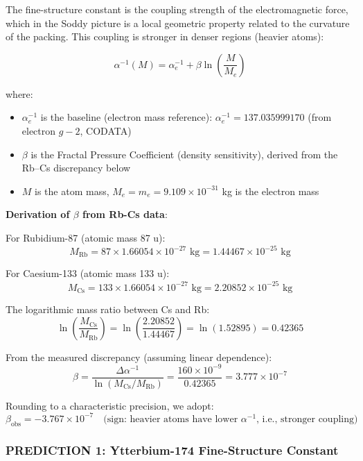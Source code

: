\documentclass[11pt,a4paper]{article}
\begin{document}
      The fine-structure constant is the coupling strength of the electromagnetic force, which in the Soddy picture is a local geometric property related to the curvature of the packing. This coupling is stronger in denser regions (heavier atoms):

      \[
      \alpha^{-1}(M) = \alpha^{-1}_e + \beta \ln\left(\frac{M}{M_e}\right)
      \]

      where:
      \begin{itemize}
        \item $\alpha^{-1}_e$ is the baseline (electron mass reference): $\alpha^{-1}_e = 137.035999170$ (from electron $g-2$, CODATA)
        \item $\beta$ is the Fractal Pressure Coefficient (density sensitivity), derived from the Rb--Cs discrepancy below
        \item $M$ is the atom mass, $M_e = m_e = 9.109 \times 10^{-31}$ kg is the electron mass
      \end{itemize}

      \noindent\textbf{Derivation of $\beta$ from Rb-Cs data}:

        For Rubidium-87 (atomic mass 87 u):
        \[
        M_\mathrm{Rb} = 87 \times 1.66054 \times 10^{-27} \text{ kg} = 1.44467 \times 10^{-25} \text{ kg}
        \]

        For Caesium-133 (atomic mass 133 u):
        \[
        M_\mathrm{Cs} = 133 \times 1.66054 \times 10^{-27} \text{ kg} = 2.20852 \times 10^{-25} \text{ kg}
        \]

      \noindent The logarithmic mass ratio between Cs and Rb:
        \[
        \ln\left(\frac{M_\mathrm{Cs}}{M_\mathrm{Rb}}\right) = \ln\left(\frac{2.20852}{1.44467}\right) = \ln(1.52895) = 0.42365
        \]

      \noindent From the measured discrepancy (assuming linear dependence):
        \[
        \beta = \frac{\Delta\alpha^{-1}}{\ln(M_\mathrm{Cs}/M_\mathrm{Rb})} = \frac{160 \times 10^{-9}}{0.42365} = 3.777 \times 10^{-7}
        \]

      Rounding to a characteristic precision, we adopt:
        \[
        \beta_{\mathrm{obs}} = -3.767 \times 10^{-7} \quad \text{(sign: heavier atoms have lower $\alpha^{-1}$, i.e., stronger coupling)}
        \]

    \subsubsection{PREDICTION 1: Ytterbium-174 Fine-Structure Constant}
\end{document}
